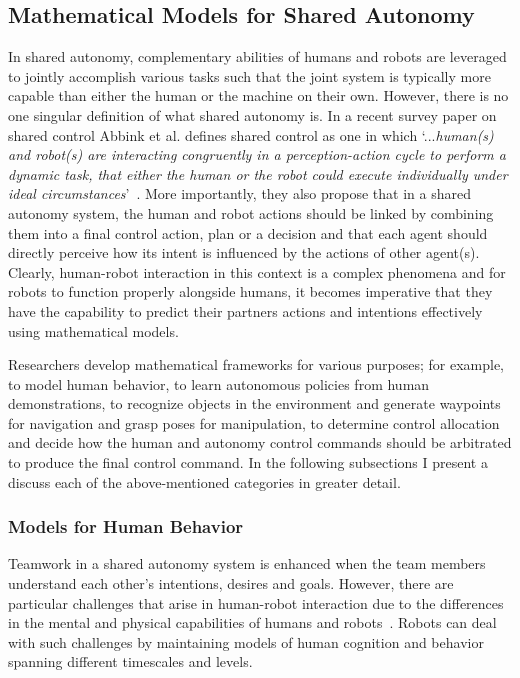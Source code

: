\documentclass[12pt]{article}
\begin{document}
\subsection{Mathematical Models for Shared Autonomy}
In shared autonomy, complementary abilities of humans and robots are leveraged to jointly accomplish various tasks such that the joint system is typically more capable than either the human or the machine on their own. However, there is no one singular definition of what shared autonomy is. In a recent survey paper on shared control Abbink et al. defines shared control as one in which `...\textit{human(s) and robot(s) are interacting congruently in a perception-action cycle to perform a dynamic task, that either the human or the robot could execute individually under ideal circumstances}'~\cite{abbink2018topology}. More importantly, they also propose that in a shared autonomy system, the human and robot actions should be linked by combining them into a final control action, plan or a decision and that each agent should directly perceive how its intent is influenced by the actions of other agent(s). Clearly, human-robot interaction in this context is a complex phenomena and for robots to function properly alongside humans, it becomes imperative that they have the capability to predict their partners actions and intentions effectively using mathematical models. 

Researchers develop mathematical frameworks for various purposes; for example, to model human behavior, to learn autonomous policies from human demonstrations, to recognize objects in the environment and generate waypoints for navigation and grasp poses for manipulation, to determine control allocation and decide how the human and autonomy control commands should be arbitrated to produce the final control command. In the following subsections I present a discuss each of the above-mentioned categories in greater detail.  

\subsubsection{Models for Human Behavior}
Teamwork in a shared autonomy system is enhanced when the team members understand each other's intentions, desires and goals. However, there are particular challenges that arise in human-robot interaction due to the differences in the mental and physical capabilities of humans and robots~\cite{hiatt2017human}. Robots can deal with such challenges by maintaining models of human cognition and behavior~\cite{javdani2015shared} spanning different timescales and levels. 
\end{document}
